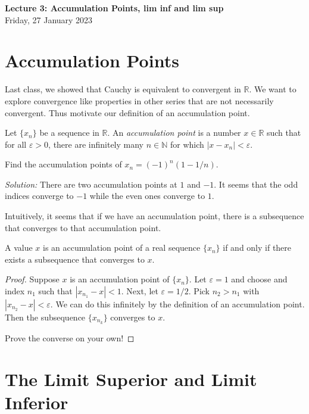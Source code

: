 \documentclass[11pt]{article}
\theoremstyle{definition}
\newcommand{\R}{\mathbb{R}}                      %
\newcommand{\N}{\mathbb{N}}
\begin{document}
\thispagestyle{empty}

\begin{center}
{\LARGE \bf Lecture 3: Accumulation Points, lim inf and lim sup}\\
{\large Friday, 27 January 2023}\\

\end{center}

\section{Accumulation Points}

Last class, we showed that Cauchy is equivalent to convergent in $\R$. We want to explore convergence like properties in other series that are not necessarily convergent. Thus motivate our definition of an accumulation point.

 Let $\{x_n\}$ be a sequence in $\R$. An \textit{accumulation point} is a number $x\in \R$ such that for all $\varepsilon>0$, there are infinitely many $n\in \N$ for which $|x-x_n|<\varepsilon$.

\ex Find the accumulation points of $x_n=(-1)^n(1-1/n)$.

\textit{Solution:} There are two accumulation points at $1$ and $-1$. It seems that the odd indices converge to $-1$ while the even ones converge to $1$.


Intuitively, it seems that if we have an accumulation point, there is a subsequence that converges to that accumulation point.

\prop A value $x$ is an accumulation point of a real sequence $\{x_n\}$ if and only if there exists a subsequence that converges to $x$.

\begin{proof}
    Suppose $x$ is an accumulation point of $\{x_n\}$. Let $\varepsilon=1$ and choose and index $n_1$ such that $|x_{n_1}-x|<1$. Next, let $\varepsilon=1/2$. Pick $n_2>n_1$ with $|x_{n_2}-x|<\varepsilon$. We can do this infinitely by the definition of an accumulation point. Then the subsequence $\{x_{n_k}\}$ converges to $x$.

    Prove the converse on your own!
\end{proof}

\section{The Limit Superior and Limit Inferior}
\end{document}
